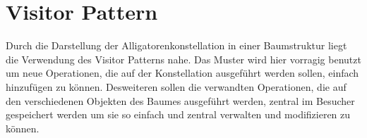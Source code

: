 \section{Visitor Pattern}
Durch die Darstellung der Alligatorenkonstellation in einer Baumstruktur liegt die Verwendung des Visitor
 Patterns nahe. Das Muster wird hier vorragig benutzt um neue Operationen, die auf der Konstellation ausgeführt werden sollen, einfach hinzufügen zu können. Desweiteren sollen die verwandten Operationen, 
die auf den verschiedenen Objekten des Baumes ausgeführt werden, zentral im Besucher gespeichert werden um
sie so einfach und zentral verwalten und modifizieren zu können. 


